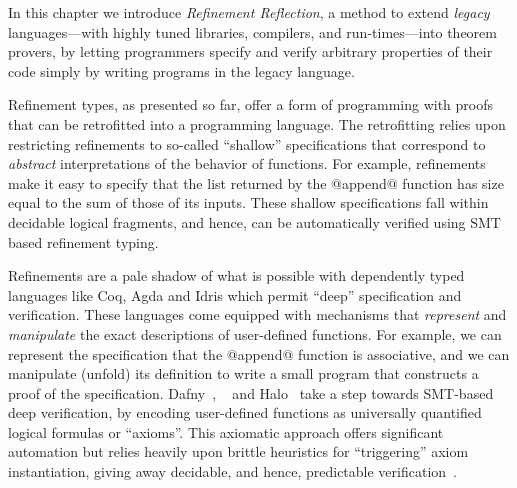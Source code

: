 In this chapter we introduce \emph{Refinement Reflection}, a method
to extend \emph{legacy} languages---with highly tuned
libraries, compilers, and run-times---into theorem provers,
by letting programmers specify and verify
arbitrary properties of their code simply
by writing programs in the legacy language.

Refinement types, as presented so far, offer a
form of programming with proofs that can be
retrofitted into a programming language.
%
The retrofitting relies upon restricting refinements
to so-called ``shallow'' specifications that
correspond to \emph{abstract} interpretations
of the behavior of functions.
%
For example, refinements make it easy to specify
that the list returned by the @append@ function
has size equal to the sum of those of its inputs.
%
These shallow specifications fall within decidable
logical fragments, and hence, can be automatically
verified using SMT based refinement typing.

Refinements are a pale shadow of what is possible
with dependently typed languages like Coq, Agda
and Idris which permit ``deep'' specification
and verification.
%
These languages come equipped with mechanisms
that \emph{represent} and \emph{manipulate} the
exact descriptions of user-defined functions.
%
For example, we can represent the specification
that the @append@ function is associative, and we
can manipulate (unfold) its definition to write a
small program that constructs a proof of the
specification.
%
Dafny~\citep{dafny}, \fstar~\citep{fstar} and
Halo~\citep{halo} take a step towards
SMT-based deep verification, by encoding
user-defined functions as universally
quantified logical formulas or ``axioms''.
%
This axiomatic approach offers significant automation
but relies heavily upon
brittle heuristics for ``triggering'' axiom instantiation,
giving away decidable, and hence, predictable
verification~\citep{Leino16}.
%

